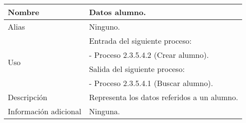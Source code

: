 \begin{center}
  \begin{tabular}{| l | p{9cm} |}
    \hline
    Nombre & \textbf{Datos alumno}.\\
    \hline
    Alias & Ninguno.\\
    \hline
    \multirow{4}{*}{Uso} & Entrada del siguiente proceso:\\
                         & - Proceso 2.3.5.4.2 (Crear alumno).\\
                         & Salida del siguiente proceso:\\
                         & - Proceso 2.3.5.4.1 (Buscar alumno).\\
    \hline
    Descripción & Representa los datos referidos a un alumno.\\
    \hline
    Información adicional & Ninguna.\\
    \hline
  \end{tabular}
\end{center}
